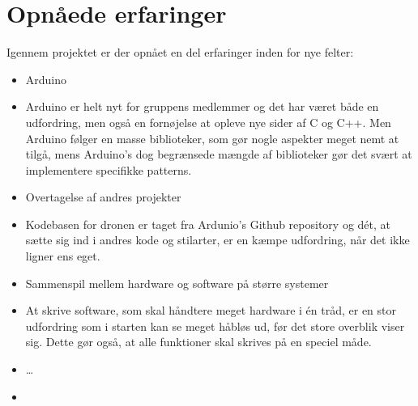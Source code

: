 \documentclass[Main]{subfiles}
\begin{document}
\section{Opnåede erfaringer}

Igennem projektet er der opnået en del erfaringer inden for nye felter:

\begin{itemize}
\item Arduino
\item[] Arduino er helt nyt for gruppens medlemmer og det har været både en udfordring, men også en fornøjelse at opleve nye sider af C og C++.
Men Arduino følger en masse biblioteker, som gør nogle aspekter meget nemt at tilgå, mens Arduino's dog begrænsede mængde af biblioteker gør det svært at implementere specifikke patterns.

\item Overtagelse af andres projekter
\item[] Kodebasen for dronen er taget fra Ardunio's Github repository og dét, at sætte sig ind i andres kode og stilarter, er en kæmpe udfordring, når det ikke ligner ens eget.


\item Sammenspil mellem hardware og software på større systemer
\item[] At skrive software, som skal håndtere meget hardware i én tråd, er en stor udfordring som i starten kan se meget håbløs ud, før det store overblik viser sig.
Dette gør også, at alle funktioner skal skrives på en speciel måde.

\item \dots{}
\item[] 


\end{itemize}
\end{document}
